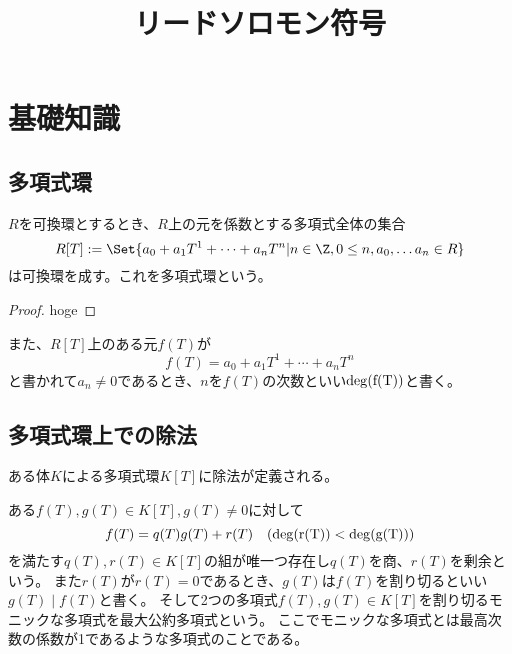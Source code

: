 \documentclass[uplatex, 11pt, a4j, dvipdfmx]{jsarticle}
\title{リードソロモン符号}
\author{}
\date{}
\begin{document}
\maketitle

\section{基礎知識}
  \subsection{多項式環}
    $R$を可換環とするとき、$R$上の元を係数とする多項式全体の集合
    \begin{equation}
      R[T] := \Set{ a_0 + a_1 T^1 + \cdots + a_n T^n | n \in \Z, 0 \le n, a_0, \ldots a_n \in R }
    \end{equation}
    は可換環を成す。これを多項式環という。
    \begin{proof}
      hoge
    \end{proof}

    また、$R[T]$上のある元$f(T)$が
    \begin{equation}
      f(T) = a_0 + a_1 T^1 + \cdots + a_n T^n
    \end{equation}
    と書かれて$a_n \neq 0$であるとき、$n$を$f(T)$の次数といい$\rm{deg}(f(T))$と書く。

  \subsection{多項式環上での除法}
    ある体$K$による多項式環$K[T]$に除法が定義される。
    \begin{thm}[除法]
      ある$f(T), g(T) \in K[T], g(T) \neq 0$に対して
      \begin{equation}
        f(T) = q(T) g(T) + r(T) \quad (\rm{deg}(r(T)) < \rm{deg}(g(T)))
      \end{equation}
      を満たす$q(T), r(T) \in K[T]$の組が唯一つ存在し$q(T)$を商、$r(T)$を剰余という。
      また$r(T)$が$r(T) = 0$であるとき、$g(T)$は$f(T)$を割り切るといい$g(T) \mid f(T)$と書く。
      そして2つの多項式$f(T), g(T) \in K[T]$を割り切るモニックな多項式を最大公約多項式という。
      ここでモニックな多項式とは最高次数の係数が1であるような多項式のことである。
    \end{thm}
\end{document}
